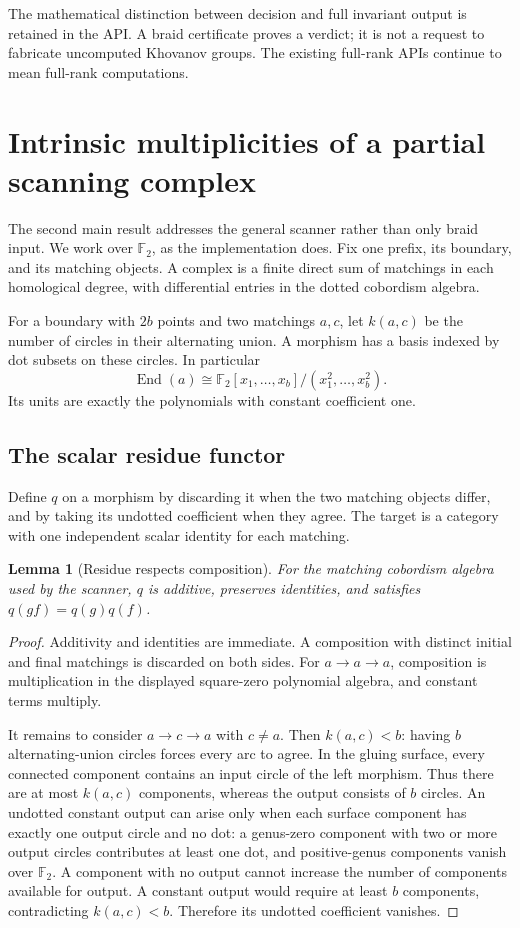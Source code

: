 \documentclass[11pt,letterpaper]{article}
\newtheorem{lemma}[theorem]{Lemma}
\theoremstyle{definition}
\newcommand{\F}{\mathbb F_2}
\newcommand{\End}{\operatorname{End}}
\begin{document}
The mathematical distinction between decision and full invariant output
is retained in the API. A braid certificate proves a verdict; it is not a
request to fabricate uncomputed Khovanov groups.
The existing full-rank APIs continue to mean full-rank computations.

\section{Intrinsic multiplicities of a partial scanning complex}
\label{sec:residue}

The second main result addresses the general scanner rather than only
braid input. We work over \(\F\), as the implementation does.
Fix one prefix, its boundary, and its matching objects.
A complex is a finite direct sum of matchings in each homological degree,
with differential entries in the dotted cobordism algebra.

For a boundary with \(2b\) points and two matchings \(a,c\), let
\(k(a,c)\) be the number of circles in their alternating union.
A morphism has a basis indexed by dot subsets on these circles.
In particular
\[
             \End(a)\cong
       \F[x_1,\ldots,x_b]/(x_1^2,\ldots,x_b^2).
\]
Its units are exactly the polynomials with constant coefficient one.

\subsection{The scalar residue functor}

Define \(q\) on a morphism by discarding it when the two matching objects
differ, and by taking its undotted coefficient when they agree.
The target is a category with one independent scalar identity for each
matching.

\begin{lemma}[Residue respects composition]
\label{lem:residuefunctor}
For the matching cobordism algebra used by the scanner, \(q\) is additive,
preserves identities, and satisfies \(q(gf)=q(g)q(f)\).
\end{lemma}
\begin{proof}
Additivity and identities are immediate. A composition with distinct
initial and final matchings is discarded on both sides.
For \(a\to a\to a\), composition is multiplication in the displayed
square-zero polynomial algebra, and constant terms multiply.

It remains to consider \(a\to c\to a\) with \(c\ne a\).
Then \(k(a,c)<b\): having \(b\) alternating-union circles forces every
arc to agree. In the gluing surface, every connected component contains
an input circle of the left morphism. Thus there are at most \(k(a,c)\)
components, whereas the output consists of \(b\) circles.
An undotted constant output can arise only when each surface component
has exactly one output circle and no dot: a genus-zero component with
two or more output circles contributes at least one dot, and positive-genus components vanish over \(\F\).
A component with no output cannot increase the number of components
available for output. A constant output would require at least \(b\)
components, contradicting \(k(a,c)<b\).
Therefore its undotted coefficient vanishes.
\end{proof}
\end{document}
